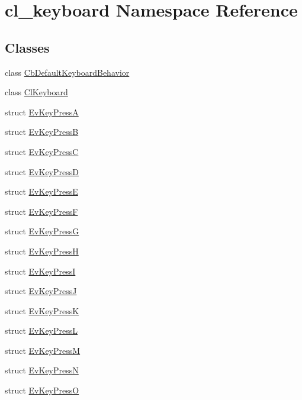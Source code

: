 \hypertarget{namespacecl__keyboard}{}\section{cl\+\_\+keyboard Namespace Reference}
\label{namespacecl__keyboard}
\subsection*{Classes}
\begin{DoxyCompactItemize}
\item 
class \hyperlink{classcl__keyboard_1_1CbDefaultKeyboardBehavior}{Cb\+Default\+Keyboard\+Behavior}
\item 
class \hyperlink{classcl__keyboard_1_1ClKeyboard}{Cl\+Keyboard}
\item 
struct \hyperlink{structcl__keyboard_1_1EvKeyPressA}{Ev\+Key\+PressA}
\item 
struct \hyperlink{structcl__keyboard_1_1EvKeyPressB}{Ev\+Key\+PressB}
\item 
struct \hyperlink{structcl__keyboard_1_1EvKeyPressC}{Ev\+Key\+PressC}
\item 
struct \hyperlink{structcl__keyboard_1_1EvKeyPressD}{Ev\+Key\+PressD}
\item 
struct \hyperlink{structcl__keyboard_1_1EvKeyPressE}{Ev\+Key\+PressE}
\item 
struct \hyperlink{structcl__keyboard_1_1EvKeyPressF}{Ev\+Key\+PressF}
\item 
struct \hyperlink{structcl__keyboard_1_1EvKeyPressG}{Ev\+Key\+PressG}
\item 
struct \hyperlink{structcl__keyboard_1_1EvKeyPressH}{Ev\+Key\+PressH}
\item 
struct \hyperlink{structcl__keyboard_1_1EvKeyPressI}{Ev\+Key\+PressI}
\item 
struct \hyperlink{structcl__keyboard_1_1EvKeyPressJ}{Ev\+Key\+PressJ}
\item 
struct \hyperlink{structcl__keyboard_1_1EvKeyPressK}{Ev\+Key\+PressK}
\item 
struct \hyperlink{structcl__keyboard_1_1EvKeyPressL}{Ev\+Key\+PressL}
\item 
struct \hyperlink{structcl__keyboard_1_1EvKeyPressM}{Ev\+Key\+PressM}
\item 
struct \hyperlink{structcl__keyboard_1_1EvKeyPressN}{Ev\+Key\+PressN}
\item 
struct \hyperlink{structcl__keyboard_1_1EvKeyPressO}{Ev\+Key\+PressO}
\item 

\end{DoxyCompactItemize}
